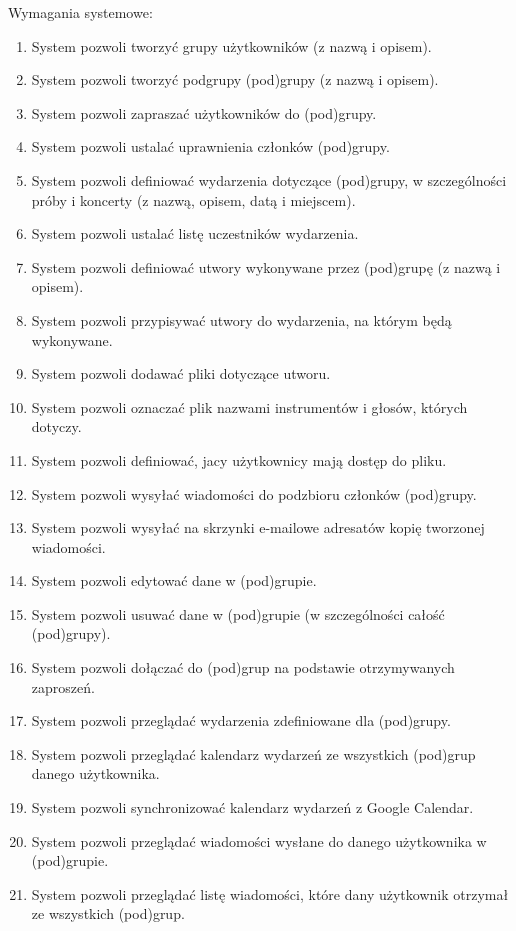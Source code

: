 \documentclass[11pt,a4paper]{article}
\renewcommand{\_}{\char`_}
\begin{document}
\vspace{10pt}

Wymagania systemowe:
\begin{enumerate}
	\item System pozwoli tworzyć grupy użytkowników (z nazwą i opisem).
	\item System pozwoli tworzyć podgrupy (pod)grupy (z nazwą i opisem).
	\item System pozwoli zapraszać użytkowników do (pod)grupy.
	\item System pozwoli ustalać uprawnienia członków (pod)grupy.
	\item System pozwoli definiować wydarzenia dotyczące (pod)grupy, w szczególności próby i koncerty (z nazwą, opisem, datą i miejscem).
	\item System pozwoli ustalać listę uczestników wydarzenia.
	\item System pozwoli definiować utwory wykonywane przez (pod)grupę (z nazwą i opisem).
	\item System pozwoli przypisywać utwory do wydarzenia, na którym będą wykonywane.
	\item System pozwoli dodawać pliki dotyczące utworu.
	\item System pozwoli oznaczać plik nazwami instrumentów i głosów, których dotyczy.
	\item System pozwoli definiować, jacy użytkownicy mają dostęp do pliku.
	\item System pozwoli wysyłać wiadomości do podzbioru członków (pod)grupy.
	\item System pozwoli wysyłać na skrzynki e-mailowe adresatów kopię tworzonej wiadomości.
	\item System pozwoli edytować dane w (pod)grupie.
	\item System pozwoli usuwać dane w (pod)grupie (w szczególności całość (pod)grupy).
	\item System pozwoli dołączać do (pod)grup na podstawie otrzymywanych zaproszeń.
	\item System pozwoli przeglądać wydarzenia zdefiniowane dla (pod)grupy.
	\item System pozwoli przeglądać kalendarz wydarzeń ze wszystkich (pod)grup danego użytkownika.
	\item System pozwoli synchronizować kalendarz wydarzeń z Google Calendar.
	\item System pozwoli przeglądać wiadomości wysłane do danego użytkownika w (pod)grupie.
	\item System pozwoli przeglądać listę wiadomości, które dany użytkownik otrzymał ze wszystkich (pod)grup.

\end{enumerate}
\end{document}
